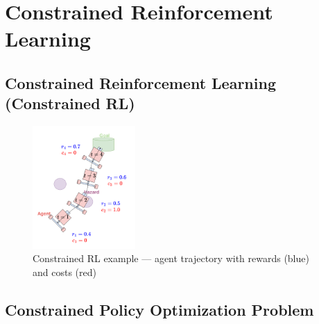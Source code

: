 \documentclass[8pt, aspectratio=169]{beamer} %
\begin{document}



\section{Constrained Reinforcement Learning}


\subsection{Constrained Reinforcement Learning (Constrained RL)}

\begin{frame}{\insertsubsectionhead}
  \begin{figure}
    \includegraphics[width=0.35\textwidth]{figures/constrained-rl1.pdf}
    \caption{Constrained RL example — agent trajectory with rewards (blue) and costs (red)}
  \end{figure}
\end{frame}


\subsection{Constrained Policy Optimization Problem}
\end{document}
